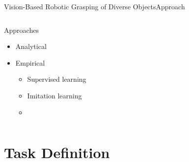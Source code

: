 \begin{frame}{Vision-Based Robotic Grasping of Diverse Objects}{Approach}
    \begin{columns}%
        \begin{column}{0.375\textwidth}%
            \begin{block}{Approaches}
                \begin{itemize}
                    \item Analytical
                    \item Empirical
                          \begin{itemize}
                              \item Supervised learning
                              \item Imitation learning
                              \item {}
                          \end{itemize}
                \end{itemize}
            \end{block}
        \end{column}
        \begin{column}{0.625\textwidth}%
            \centering
        \end{column}
    \end{columns}
\end{frame}

\section{Task Definition}

